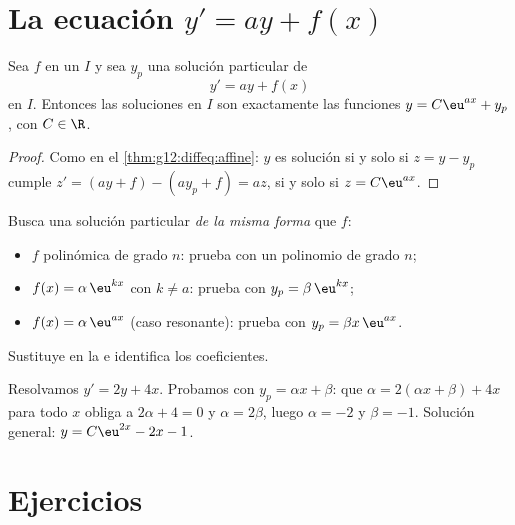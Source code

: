 \section{La ecuación \texorpdfstring{$y' = ay + f(x)$}{y' = ay + f(x)}}

\begin{proposition}\label{prop:g12:diffeq:general}
Sea $f$  en un  $I$ y sea $y_p$ una solución particular de
\[
y' = ay + f(x)
\]
en $I$. Entonces las soluciones en $I$ son exactamente las funciones
$y = C\eu^{ax} + y_p$, con $C \in \R$.
\end{proposition}

\begin{proof}
Como en el \cref{thm:g12:diffeq:affine}: $y$ es solución si y solo si
$z = y - y_p$ cumple $z' = (ay + f) - (ay_p + f) = az$, si y solo si
$z = C\eu^{ax}$.
\end{proof}

\begin{method}\label{met:g12:diffeq:particular}
Busca una solución particular \emph{de la misma forma} que $f$:
\begin{itemize}
  \item $f$ polinómica de grado $n$: prueba con un polinomio de grado $n$;
  \item $f(x) = \alpha\,\eu^{kx}$ con $k \neq a$: prueba con
        $y_p = \beta\,\eu^{kx}$;
  \item $f(x) = \alpha\,\eu^{ax}$ (caso resonante): prueba con
        $y_p = \beta x\,\eu^{ax}$.
\end{itemize}
Sustituye en la  e identifica los coeficientes.
\end{method}

\begin{example}\label{ex:g12:diffeq:particular}
Resolvamos $y' = 2y + 4x$. Probamos con $y_p = \alpha x + \beta$: que
$\alpha = 2(\alpha x + \beta) + 4x$ para todo $x$ obliga a
$2\alpha + 4 = 0$ y $\alpha = 2\beta$, luego $\alpha = -2$ y $\beta = -1$.
Solución general: $y = C\eu^{2x} - 2x - 1$.
\end{example}

\section{Ejercicios}

